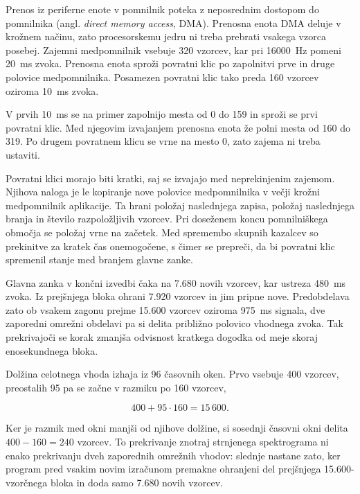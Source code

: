 Prenos iz periferne enote v pomnilnik poteka z neposrednim dostopom do
pomnilnika (angl. \emph{direct memory access}, DMA). Prenosna enota DMA deluje
v krožnem načinu, zato procesorskemu jedru ni
treba prebrati vsakega vzorca posebej. Zajemni medpomnilnik vsebuje 320
vzorcev, kar pri \SI{16000}{\hertz} pomeni \SI{20}{\milli\second} zvoka.
Prenosna enota sproži povratni klic po zapolnitvi prve in druge polovice
medpomnilnika. Posamezen povratni klic tako preda 160 vzorcev oziroma
\SI{10}{\milli\second} zvoka.

V prvih \SI{10}{\milli\second} se na primer zapolnijo mesta od 0 do 159 in
sproži se prvi povratni klic. Med njegovim izvajanjem prenosna enota že polni
mesta od 160 do 319. Po drugem povratnem klicu se vrne na mesto 0, zato zajema
ni treba ustaviti.

Povratni klici morajo biti kratki, saj se izvajajo med neprekinjenim zajemom.
Njihova naloga je le kopiranje nove polovice medpomnilnika v večji krožni
medpomnilnik aplikacije. Ta hrani položaj naslednjega zapisa, položaj
naslednjega branja in število razpoložljivih vzorcev. Pri doseženem koncu
pomnilniškega območja se položaj vrne na začetek. Med spremembo skupnih
kazalcev so prekinitve za kratek čas onemogočene, s čimer se prepreči, da bi
povratni klic spremenil stanje med branjem glavne zanke.

Glavna zanka v končni izvedbi čaka na 7.680 novih vzorcev, kar ustreza
\SI{480}{\milli\second} zvoka. Iz prejšnjega bloka ohrani 7.920 vzorcev in
jim pripne nove. Predobdelava zato ob vsakem zagonu prejme 15.600 vzorcev
oziroma \SI{975}{\milli\second} signala, dve zaporedni omrežni obdelavi pa si
delita približno polovico vhodnega zvoka. Tak prekrivajoči se korak zmanjša
odvisnost kratkega dogodka od meje skoraj enosekundnega bloka.

Dolžina celotnega vhoda izhaja iz 96 časovnih oken. Prvo vsebuje 400 vzorcev,
preostalih 95 pa se začne v razmiku po 160 vzorcev,

\begin{equation}
  400 + 95 \cdot 160 = 15\,600.
  \label{eq:dolzina-zvocnega-bloka}
\end{equation}

Ker je razmik med okni manjši od njihove dolžine, si sosednji časovni okni
delita $400-160=240$ vzorcev. To prekrivanje znotraj strnjenega spektrograma ni enako
prekrivanju dveh zaporednih omrežnih vhodov: slednje nastane zato, ker program
pred vsakim novim izračunom premakne ohranjeni del prejšnjega 15.600-vzorčnega
bloka in doda samo 7.680 novih vzorcev.

